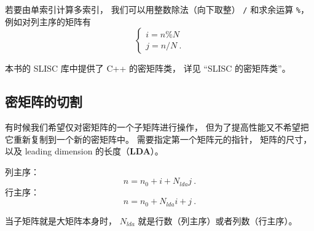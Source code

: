 若要由单索引计算多索引， 我们可以用整数除法（向下取整） \verb|/| 和求余运算 \verb|%|， 例如对列主序的矩阵有
\begin{equation}
\begin{cases}
i = n \% N\\
j = n / N~.
\end{cases}
\end{equation}

本书的 SLISC 库中提供了 C++ 的密矩阵类， 详见 “SLISC 的密矩阵类”。

\subsection{密矩阵的切割}
有时候我们希望仅对密矩阵的一个子矩阵进行操作， 但为了提高性能又不希望把它重新复制到一个新的密矩阵中。
需要指定第一个矩阵元的指针， 矩阵的尺寸， 以及 leading dimension 的长度（\textbf{LDA}）。

列主序： 
\begin{equation}
n = n_0 + i + N_{lda} j~.
\end{equation}
行主序：
\begin{equation}
n = n_0 + N_{lda} i + j~.
\end{equation}

当子矩阵就是大矩阵本身时， $N_{lda}$ 就是行数（列主序）或者列数（行主序）。
